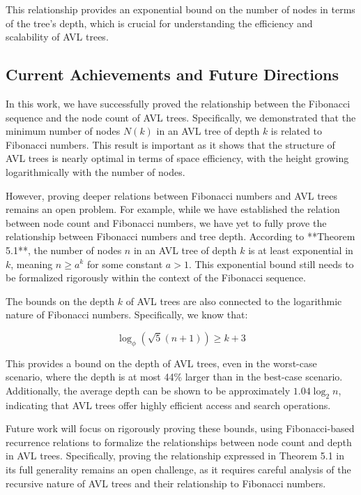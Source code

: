This relationship provides an exponential bound on the number of nodes in terms of the tree’s depth, which is crucial for understanding the efficiency and scalability of AVL trees.

\subsection*{Current Achievements and Future Directions}

In this work, we have successfully proved the relationship between the Fibonacci sequence and the node count of AVL trees. Specifically, we demonstrated that the minimum number of nodes \( N(k) \) in an AVL tree of depth \( k \) is related to Fibonacci numbers. This result is important as it shows that the structure of AVL trees is nearly optimal in terms of space efficiency, with the height growing logarithmically with the number of nodes.

However, proving deeper relations between Fibonacci numbers and AVL trees remains an open problem. For example, while we have established the relation between node count and Fibonacci numbers, we have yet to fully prove the relationship between Fibonacci numbers and tree depth. According to **Theorem 5.1**, the number of nodes \( n \) in an AVL tree of depth \( k \) is at least exponential in \( k \), meaning \( n \geq a^k \) for some constant \( a > 1 \). This exponential bound still needs to be formalized rigorously within the context of the Fibonacci sequence.

The bounds on the depth \( k \) of AVL trees are also connected to the logarithmic nature of Fibonacci numbers. Specifically, we know that:

\[
\log_\phi \left( \sqrt{5}(n + 1) \right) \geq k + 3
\]

This provides a bound on the depth of AVL trees, even in the worst-case scenario, where the depth is at most 44\% larger than in the best-case scenario. Additionally, the average depth can be shown to be approximately \( 1.04 \log_2 n \), indicating that AVL trees offer highly efficient access and search operations.

Future work will focus on rigorously proving these bounds, using Fibonacci-based recurrence relations to formalize the relationships between node count and depth in AVL trees. Specifically, proving the relationship expressed in Theorem 5.1 in its full generality remains an open challenge, as it requires careful analysis of the recursive nature of AVL trees and their relationship to Fibonacci numbers.


